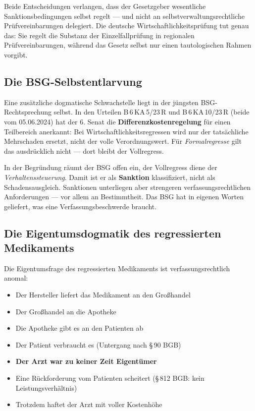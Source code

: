 \documentclass{umbruch-position}
\begin{document}
Beide Entscheidungen verlangen, dass der Gesetzgeber wesentliche Sanktionsbedingungen selbst regelt — und nicht an selbstverwaltungsrechtliche Prüfvereinbarungen delegiert. Die deutsche Wirtschaftlichkeitsprüfung tut genau das: Sie regelt die Substanz der Einzelfallprüfung in regionalen Prüfvereinbarungen, während das Gesetz selbst nur einen tautologischen Rahmen vorgibt.

\subsection{Die BSG-Selbstentlarvung}

Eine zusätzliche dogmatische Schwachstelle liegt in der jüngsten BSG-Rechtsprechung selbst. In den Urteilen B\,6\,KA\,5/23\,R und B\,6\,KA\,10/23\,R (beide vom 05.06.2024) hat der 6. Senat die \textbf{Differenzkostenregelung} für einen Teilbereich anerkannt: Bei Wirtschaftlichkeitsregressen wird nur der tatsächliche Mehrschaden ersetzt, nicht der volle Verordnungswert. Für \textit{Formalregresse} gilt das ausdrücklich nicht — dort bleibt der Vollregress.

In der Begründung räumt der BSG offen ein, der Vollregress diene der \textit{Verhaltenssteuerung}. Damit ist er als \textbf{Sanktion} klassifiziert, nicht als Schadensausgleich. Sanktionen unterliegen aber strengeren verfassungsrechtlichen Anforderungen — vor allem an Bestimmtheit. Das BSG hat in eigenen Worten geliefert, was eine Verfassungsbeschwerde braucht.

\subsection{Die Eigentumsdogmatik des regressierten Medikaments}

Die Eigentumsfrage des regressierten Medikaments ist verfassungsrechtlich anomal:

\begin{itemize}[nosep]
  \item Der Hersteller liefert das Medikament an den Großhandel
  \item Der Großhandel an die Apotheke
  \item Die Apotheke gibt es an den Patienten ab
  \item Der Patient verbraucht es (Untergang nach \S\,90 BGB)
  \item \textbf{Der Arzt war zu keiner Zeit Eigentümer}
  \item Eine Rückforderung vom Patienten scheitert (\S\,812 BGB: kein Leistungsverhältnis)
  \item Trotzdem haftet der Arzt mit voller Kostenhöhe
\end{itemize}
\end{document}
